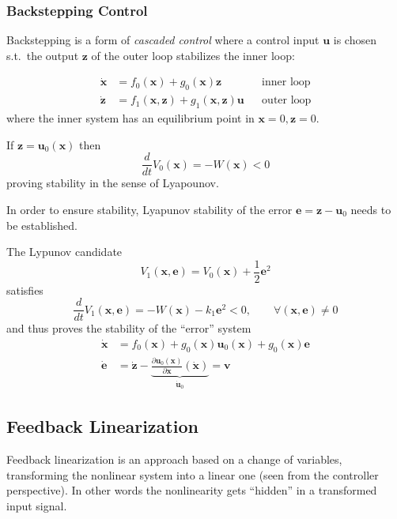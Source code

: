 \subsubsection{Backstepping Control}
Backstepping is a form of \textit{cascaded control} where a control input $\mathbf{u}$ is chosen s.t.\ the output $\mathbf{z}$ of the outer loop stabilizes the inner loop:

\noindent\begin{align*}
    \dot{\mathbf{x}} & = f_0(\mathbf{x}) + g_0(\mathbf{x})\mathbf{z}                         &  & \text{inner loop} \\
    \dot{\mathbf{z}} & = f_1(\mathbf{x},\mathbf{z}) + g_1(\mathbf{x}, \mathbf{z}) \mathbf{u} &  & \text{outer loop}
\end{align*}
where the inner system has an equilibrium point in $\mathbf{x}=0, \mathbf{z}=0$.

\newpar{}
If $\mathbf{z} = \mathbf{u}_0(\mathbf{x})$ then
\noindent\begin{equation*}
    \frac{d}{dt} V_0(\mathbf{x}) = -W(\mathbf{x}) < 0
\end{equation*}
proving stability in the sense of Lyapounov.

\newpar{}

In order to ensure stability, Lyapunov stability of the error $\mathbf{e} = \mathbf{z}-\mathbf{u}_0$ needs to be established.

The Lypunov candidate
\noindent\begin{equation*}
    V_1(\mathbf{x}, \mathbf{e}) = V_0(\mathbf{x})+\frac{1}{2} \mathbf{e}^2
\end{equation*}
satisfies
\noindent\begin{equation*}
    \frac{d}{dt}V_1(\mathbf{x}, \mathbf{e}) = -W(\mathbf{x}) - k_1 \mathbf{e}^2 <0 ,\qquad \forall(\mathbf{x},\mathbf{e}) \neq 0
\end{equation*}
and thus proves the stability of the ``error'' system
\noindent\begin{align*}
    \dot{\mathbf{x}} & = f_0(\mathbf{x})+g_0(\mathbf{x})\mathbf{u}_0(\mathbf{x}) + g_0(\mathbf{x})\mathbf{e}                                                               \\
    \dot{\mathbf{e}} & = \dot{\mathbf{z}} - \underbrace{\frac{\partial \mathbf{u}_0(\mathbf{x})}{\partial \mathbf{x}}(\dot{\mathbf{x}})}_{\dot{\mathbf{u}}_0} = \mathbf{v}
\end{align*}

\subsection{Feedback Linearization}
Feedback linearization is an approach based on a change of variables, transforming the nonlinear system into a linear one (seen from the controller perspective). In other words the nonlinearity gets ``hidden'' in a transformed input signal.

